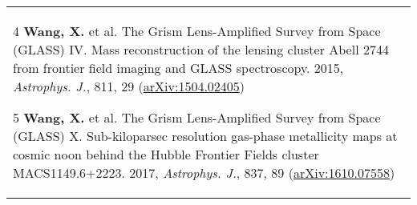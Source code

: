 \documentclass[letterpaper,10pt]{article}
\begin{document}
\begin{longtable}{p{6in}}
\begin{list}{}{\leftmargin=0.5em}
    \item[4]\hypertarget{15.wang.apj}{} \textbf{Wang, X.} et al. The Grism Lens-Amplified Survey from Space (GLASS) IV. 
        Mass reconstruction of the lensing cluster Abell 2744 from frontier field imaging and GLASS spectroscopy. 2015, 
        \textit{Astrophys. J.}, 811, 29 (\href{http://arxiv.org/abs/1504.02405}{arXiv:1504.02405})
    \item[5]\hypertarget{17.wang.apj}{} \textbf{Wang, X.} et al. The Grism Lens-Amplified Survey from Space (GLASS) X.
        Sub-kiloparsec resolution gas-phase metallicity maps at cosmic noon behind the Hubble Frontier Fields cluster MACS1149.6+2223. 
        2017, \textit{Astrophys. J.}, 837, 89 (\href{http://arxiv.org/abs/1610.07558}{arXiv:1610.07558})
\end{list}  \\
\end{longtable}

\vspace{-2em}
\end{document}
